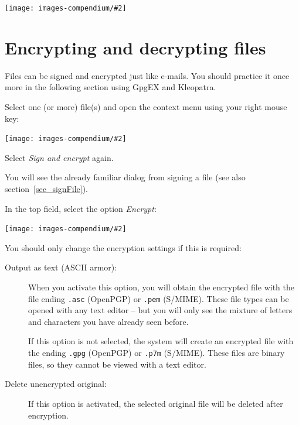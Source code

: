\documentclass[a4paper,11pt,oneside,openright,titlepage]{scrbook}
\newcommand{\Menu}[1]{\textit{#1}}
\newcommand{\Filename}[1]{\small{\texttt{#1}}\normalsize}
\newcommand{\Email}{e-mail}
\newcommand{\IncludeImage}[2][]{
\begin{center}
  \texttt{[image: images-compendium/\#2]}%
\end{center}
}
\begin{document}
\IncludeImage[width=0.85\textwidth]{sc-kleopatra-verifyFile2a-badSignature_en}


\clearpage
\section{Encrypting and decrypting files}

Files can be signed and encrypted just like \Email{}s. You should
practice it once more in the following section using GpgEX and
Kleopatra.

Select one (or more) file(s) and open the context menu using your
right mouse key:


\IncludeImage[width=0.3\textwidth]{sc-gpgex-contextmenu-signEncrypt_en}

Select \Menu{Sign and encrypt} again.

\clearpage
You will see the already familiar dialog from signing a file (see also
section~\ref{sec_signFile}).

In the top field, select the option \Menu{Encrypt}:

\IncludeImage[width=0.85\textwidth]{sc-kleopatra-encryptFile1_en}


You should only change the encryption settings if this is required:
\begin{description}
    \item[Output as text (ASCII armor):] When you
        activate this option, you will obtain the encrypted file with
        the file ending \Filename{.asc} (OpenPGP) or \Filename{.pem}
        (S/MIME).  These file types can be opened with any text editor
        -- but you will only see the mixture of letters and characters
        you have already seen before.

        If this option is not selected, the system will create an
        encrypted file with the ending  \Filename{.gpg} (OpenPGP) or
        \Filename{.p7m} (S/MIME). These files are binary files, so
        they cannot be viewed with a text editor.

    \item[Delete unencrypted original:] If this option is activated,
        the selected original file will be deleted after encryption.
\end{description}
\end{document}
